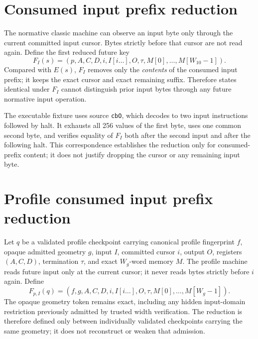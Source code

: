 \documentclass{article}
\begin{document}
\section{Consumed input prefix reduction}

The normative classic machine can observe an input byte only through the current
committed input cursor. Bytes strictly before that cursor are not read again.
Define the first reduced future key
\begin{equation}
  F_I(s)=\left(
    p,A,C,D,i,I[i\ldots],O,\tau,M[0],\ldots,M[W_{10}-1]
  \right).
  \label{eq:state-graph-consumed-input-prefix}
\end{equation}
Compared with $E(s)$, $F_I$ removes only the \emph{contents} of the consumed
input prefix; it keeps the exact cursor and exact remaining suffix. Therefore
states identical under $F_I$ cannot distinguish prior input bytes through any
future normative input operation.

The executable fixture uses source \texttt{cbO}, which decodes to two input
instructions followed by halt. It exhausts all 256 values of the first byte,
uses one common second byte, and verifies equality of $F_I$ both after the
second
input and after the following halt. This correspondence establishes the
reduction only for consumed-prefix content; it does not justify dropping the
cursor or any remaining input byte.

\section{Profile consumed input prefix reduction}

Let $q$ be a validated profile checkpoint carrying canonical profile fingerprint
$f$, opaque admitted geometry $g$, input $I$, committed cursor $i$, output $O$,
registers $(A,C,D)$, termination $\tau$, and exact $W_g$-word memory $M$. The
profile machine reads future input only at the current cursor; it never reads
bytes strictly before $i$ again. Define
\begin{equation}
  F_{p,I}(q)=\left(
    f,g,A,C,D,i,I[i\ldots],O,\tau,M[0],\ldots,M[W_g-1]
  \right).
  \label{eq:state-graph-profile-consumed-input-prefix}
\end{equation}
The opaque geometry token remains exact, including any hidden input-domain
restriction previously admitted by trusted width verification. The reduction is
therefore defined only between individually validated checkpoints carrying the
same geometry; it does not reconstruct or weaken that admission.
\end{document}
